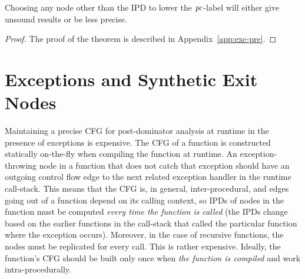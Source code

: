 \begin{myThm}[Precision]\label{thm1:exc}
Choosing any node other than the IPD to lower the $\mathit{pc}$-label will either
give unsound results or be less precise.
\end{myThm}
\begin{proof}
The proof of the theorem is described in Appendix~\ref{app:exc-pre}.
\end{proof}

\section{Exceptions and Synthetic Exit Nodes}
\label{sec:excsen}
Maintaining a precise CFG for post-dominator analysis at runtime in the 
presence of exceptions is expensive. The CFG of a function is 
constructed statically on-the-fly when compiling the function at 
runtime. An exception-throwing node in a
function that does not catch that exception should have an outgoing
control flow edge to the next related exception handler in the runtime
call-stack. This means that the CFG is, in general, inter-procedural,
and edges going out of a function depend on its calling context, so
IPDs of nodes in the function must be computed \emph{every time the
  function is called} (the IPDs change based on the earlier functions
in the call-stack that called the particular function where the
exception occurs). Moreover, in the case of recursive functions, the
nodes must be replicated for every call. This is rather
expensive. Ideally, the function's CFG should be built only once when
\emph{the function is compiled} and work intra-procedurally. 

